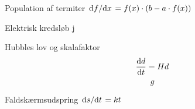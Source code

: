 \documentclass[crop=false, class=memoir]{standalone}
\begin{document}
\begin{opgave}[2]{Population af termiter}
$\dv*{f}{x} = f(x)\cdot(b-a\cdot f(x))$

\end{opgave}

\begin{opgave}[2]{Elektrisk kredsløb}
j
\end{opgave}

\begin{opgave}[2]{Hubbles lov og skalafaktor}
\begin{equation}
    \dv{d}{t} = H d
\end{equation}
\begin{equation}
    g
\end{equation}
\end{opgave}

\begin{opgave}[3]{Faldskærmsudspring}
$\dv*{s}{t} = kt$
\end{opgave}
\end{document}
